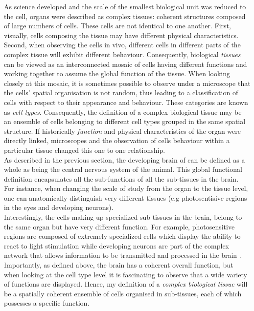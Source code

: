     As science developed and the scale of the smallest biological unit was reduced to the cell, organs were described as complex tissues: coherent structures composed of large numbers of cells. These cells are not identical to one another. First, visually, cells composing the tissue may have different physical characteristics. Second, when observing the cells in vivo, different cells in different parts of the complex tissue will exhibit different behaviour. Consequently, biological \emph{tissues} can be viewed as an interconnected mosaic of cells having different functions and working together to assume the global function of the tissue. When looking closely at this mosaic, it is sometimes possible to observe under a microscope \citep{young13} that the cells' spatial organisation is not random, thus leading to a classification of cells with respect to their appearance and behaviour. These categories are known as \emph{cell types}. Consequently, the definition of a complex biological tissue may be an ensemble of cells belonging to different cell types grouped in the same spatial structure.  If historically \emph{function} and physical characteristics of the organ were directly linked, microscopes and the observation of cells behaviour within a particular tissue changed this one to one relationship.\\
    
    As described in the previous section, the developing brain of \platyfull{} can be defined as a whole as being the central nervous system of the animal. This global functional definition encapsulates all the sub-functions of all the sub-tissues in the brain. For instance, when changing the scale of study from the organ to the tissue level, one can anatomically distinguish very different tissues (e.g photosentisive regions in the eyes and developing neurons).\\
    
    Interestingly, the cells making up specialized sub-tissues in the brain, belong to the same organ but have very different function. For example, photosensitive regions are composed of extremely specialized cells which display the ability to react to light stimulation \cite{arendt02} while developing neurons are part of the complex network that allows information to be transmitted and processed in the brain \cite{Fischer10}. Importantly, as defined above, the brain has a coherent overall function, but when looking at the cell type level it is fascinating to observe that a wide variety of functions are displayed. Hence, my definition of a \emph{complex biological tissue} will be a spatially coherent ensemble of cells organised in sub-tissues, each of which possesses a specific function.\\
    
